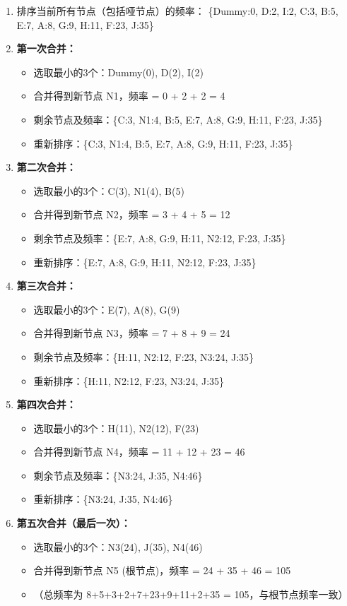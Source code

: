 \begin{enumerate}
	\item 排序当前所有节点（包括哑节点）的频率：
\{Dummy:0, D:2, I:2, C:3, B:5, E:7, A:8, G:9, H:11, F:23, J:35\}
	\item \textbf{第一次合并：}
	\begin{itemize}
		\item 选取最小的3个：Dummy(0), D(2), I(2)
		\item 合并得到新节点 N1，频率 = 0 + 2 + 2 = 4
		\item 剩余节点及频率：\{C:3, N1:4, B:5, E:7, A:8, G:9, H:11, F:23, J:35\}
		\item 重新排序：\{C:3, N1:4, B:5, E:7, A:8, G:9, H:11, F:23, J:35\}
	\end{itemize}
	\item \textbf{第二次合并：}
	\begin{itemize}
		\item 选取最小的3个：C(3), N1(4), B(5)
		\item 合并得到新节点 N2，频率 = 3 + 4 + 5 = 12
		\item 剩余节点及频率：\{E:7, A:8, G:9, H:11, N2:12, F:23, J:35\}
		\item 重新排序：\{E:7, A:8, G:9, H:11, N2:12, F:23, J:35\}
	\end{itemize}
	\item \textbf{第三次合并：}
	\begin{itemize}
		\item 选取最小的3个：E(7), A(8), G(9)
		\item 合并得到新节点 N3，频率 = 7 + 8 + 9 = 24
		\item 剩余节点及频率：\{H:11, N2:12, F:23, N3:24, J:35\}
		\item 重新排序：\{H:11, N2:12, F:23, N3:24, J:35\}
	\end{itemize}
	\item \textbf{第四次合并：}
	\begin{itemize}
		\item 选取最小的3个：H(11), N2(12), F(23)
		\item 合并得到新节点 N4，频率 = 11 + 12 + 23 = 46
		\item 剩余节点及频率：\{N3:24, J:35, N4:46\}
		\item 重新排序：\{N3:24, J:35, N4:46\}
	\end{itemize}
	\item \textbf{第五次合并（最后一次）：}
	\begin{itemize}
		\item 选取最小的3个：N3(24), J(35), N4(46)
		\item 合并得到新节点 N5 (根节点)，频率 = 24 + 35 + 46 = 105
		\item （总频率为 8+5+3+2+7+23+9+11+2+35 = 105，与根节点频率一致）
	\end{itemize}
\end{enumerate}

